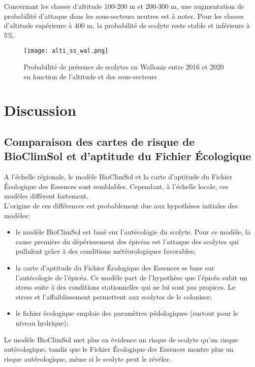 Concernant les classes d'altitude 100-200 m et 200-300 m, une augmentation de probabilité d'attaque dans les sous-secteurs neutres est à noter. 
Pour les classes d'altitude supérieure à 400 m, la probabilité de scolyte reste stable et inférieure à 5\%.
\begin{figure} [htbp] 
	\centering
	\texttt{[image: alti\_ss\_wal.png]}
	\caption{Probabilité de présence de scolytes en Wallonie entre 2016 et 2020 en fonction de l'altitude et des sous-secteurs }
	\label{fig:wall}
\end{figure}


 \section{Discussion}
\subsection{Comparaison des cartes de risque de BioClimSol et d'aptitude du Fichier Écologique}
A l'échelle régionale, le modèle BioClimSol et la carte d'aptitude du Fichier Écologique des Essences sont semblables. Cependant, à l'échelle locale, ces modèles diffèrent fortement.\\

L'origine de ces différences est probablement due aux hypothèses initiales des modèles:

\begin{itemize}
	\item le modèle BioClimSol est basé sur l'autécologie du scolyte. Pour ce modèle, la cause première du dépérissement des épicéas est l'attaque des scolytes qui pullulent grâce à des conditions météorologiques favorables;
	\item la carte d'aptitude du Fichier Écologique des Essences se base sur l'autécologie de l'épicéa. Ce modèle part de l'hypothèse que l'épicéa subit un stress suite à des conditions stationnelles qui ne lui sont pas propices. Le stress et l'affaiblissement permettent aux scolytes de le coloniser;
	\item le fichier écologique emploie des paramètres pédologiques (surtout pour le niveau hydrique);
\end{itemize}

Le modèle BioClimSol met plus en évidence un risque de scolyte qu'un risque autécologique, tandis que le Fichier Écologique des Essences montre plus un risque autécologique, même si le scolyte peut le révéler.






